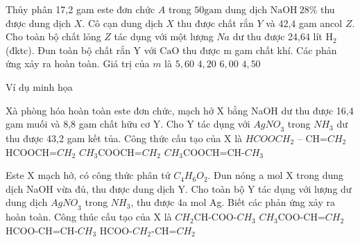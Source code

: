 
\begin{ex}[3][]
Thủy phân 17,2 gam este đơn chức $A$ trong $50 \mathrm{gam}$ dung dịch $\mathrm{NaOH} ~28 \%$ thu được dung dịch $X$. Cô cạn dung dịch $X$ thu được chất rắn $Y$ và 42,4 gam ancol $Z$. Cho toàn bộ chất lỏng $Z$ tác dụng với một lượng $N a$ dư thu được 24,64 lít $\mathrm{H}_2$ (đktc). Đun toàn bộ chất rắn $\mathrm{Y}$ với $\mathrm{CaO}$ thu được $\mathrm{m}$ gam chất khí. Các phản ứng xảy ra hoàn toàn. Giá trị của $m$ là           
	\choice
	{%
		$ 5,60 $
	}
	{%
	\True	$4,20$
	}
	{%
		$ 6,00 $
	}
	{%
		$ 4,50 $
	}
	\sodongkeex[10]
\end{ex}







\begin{vdm}{Ví dụ minh họa}
\end{vdm}

\begin{vdex}[2][]
	Xà phòng hóa hoàn toàn este đơn chức, mạch hở X bằng NaOH dư thu được 16,4 gam muối và 8,8 gam chất hữu cơ Y. Cho Y tác dụng với ${AgNO}_3$ trong ${NH}_3$ dư thu được 43,2 gam kết tủa. Công thức cấu tạo của X là
	\choice
	{ %
		${HCOOCH}_2$ – CH=${CH}_2$
	}
	{%
		 HCOOCH=${CH}_2$
	}
	{%
		\True ${CH}_3$COOCH=${CH}_2$
	}
	{%
		${CH}_3$COOCH=CH-${CH}_3$
    }
	\huongdan{}
\end{vdex}

\begin{vdex}[2]%
	Este X mạch hở, có công thức phân tử ${C}_4{H}_6{O}_2$. Đun nóng a mol X trong dung dịch NaOH vừa đủ, thu được dung dịch Y. Cho toàn bộ Y tác dụng với lượng dư dung dịch ${AgNO}_3$ trong ${NH}_3$, thu được 4a mol Ag. Biết các phản ứng xảy ra hoàn toàn. Công thúc cấu tạo của X là
	\choice
	{ ${CH}_2$CH-COO-${CH}_3$}
	{ ${CH}_3$COO-CH=${CH}_2$}
	{\True HCOO-CH=CH-${CH}_3$}
	{ HCOO-${CH}_2$-CH=${CH}_2$}
	\huongdan{}
\end{vdex}

